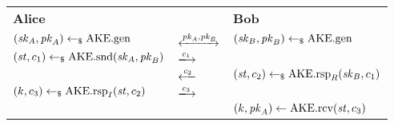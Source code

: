 \begin{tabular}{lC{3cm}l}
    \textbf{Alice} &  & \textbf{Bob}\\
    $(\sk_A, \pk_A)\getsr\AKEgen$ & $\xleftrightarrow{\pk_A,\pk_B}$ & $(\sk_B, \pk_B)\getsr\AKEgen$ \\
    $(\st, c_1)\getsr\AKEsnd(\sk_A, \pk_B)$ & $\xlongrightarrow{c_1}$ & \\
    & $\xlongleftarrow{c_2}$ & $(\st, c_2)\getsr\AKErsp_R(\sk_B, c_1)$\\
    $(k,c_3)\getsr\AKErsp_I(\st, c_2)$ & $\xlongrightarrow{c_3}$ & \\
    & & $(k, \pk_A)\gets\AKErcv(\st, c_3)$
\end{tabular}